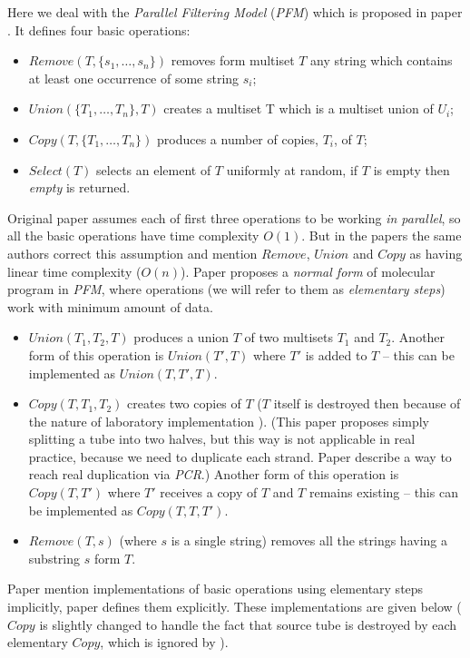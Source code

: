 Here we deal with the \emph{Parallel Filtering Model} (\emph{PFM}) which is proposed in paper \cite{Amos:1996}. It defines four basic operations:
\begin{itemize}
	\item $Remove(T, \{s_1, \dots, s_n\})$ removes form multiset $T$ any string which contains at least one occurrence of some string $s_i$;
	\item $Union(\{T_1, \dots, T_n\}, T)$ creates a multiset T which is a multiset union of $U_i$;
	\item $Copy(T, \{T_1, \dots, T_n\})$ produces a number of copies, $T_i$, of $T$;
	\item $Select(T)$ selects an element of $T$ uniformly at random, if $T$ is empty then \emph{empty} is returned.
\end{itemize}
Original paper \cite{Amos:1996} assumes each of first three operations to be working \emph{in parallel}, so all the basic operations have time complexity $O(1)$. But in the papers \cite{Amos:1997, Amos:2003:Book} the same authors correct this assumption and mention $Remove$, $Union$ and $Copy$ as having linear time complexity ($O(n)$). 
Paper \cite{Katsanyi:2003} proposes a \emph{normal form} of molecular program in \emph{PFM}, where operations (we will refer to them as \emph{elementary steps}) work with minimum amount of data.
\begin{itemize}
	\item $Union(T_1, T_2, T)$ produces a union $T$ of two multisets $T_1$ and $T_2$. Another form of this operation is $Union(T', T)$ where $T'$ is added to $T$ -- this can be implemented as $Union(T, T', T)$.
	\item $Copy(T, T_1, T_2)$ creates two copies of $T$ ($T$ itself is destroyed then because of the nature of laboratory implementation \cite{Amos:1996}). (This paper proposes simply splitting a tube into two halves, but this way is not applicable in real practice, because we need to duplicate each strand. Paper \cite{Adleman:1994} describe a way to reach real duplication via \emph{PCR}.) Another form of this operation is $Copy(T, T')$ where $T'$ receives a copy of $T$ and $T$ remains existing -- this can be implemented as $Copy(T, T, T')$.
	\item $Remove(T, s)$ (where $s$ is a single string) removes all the strings having a substring $s$ form $T$.
\end{itemize}

Paper \cite{Amos:1997} mention implementations of basic operations using elementary steps implicitly, paper \cite{Katsanyi:2003} defines them explicitly. These implementations are given below ($Copy$ is slightly changed to handle the fact that source tube is destroyed by each elementary $Copy$, which is ignored by \cite{Katsanyi:2003}).

